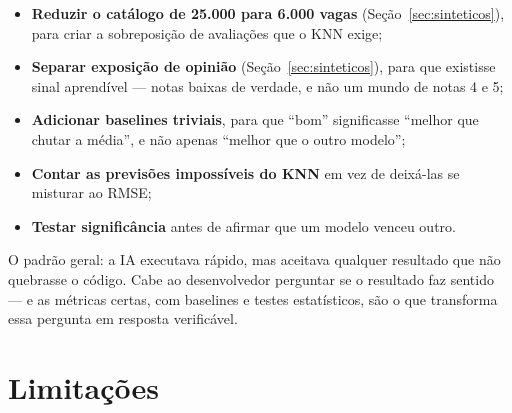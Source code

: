\documentclass[12pt,a4paper]{article}
\begin{document}
\begin{itemize}
    \item \textbf{Reduzir o catálogo de 25.000 para 6.000 vagas} (Seção~\ref{sec:sinteticos}), para criar a sobreposição de avaliações que o KNN exige;
    \item \textbf{Separar exposição de opinião} (Seção~\ref{sec:sinteticos}), para que existisse sinal aprendível --- notas baixas de verdade, e não um mundo de notas 4 e 5;
    \item \textbf{Adicionar baselines triviais}, para que ``bom'' significasse ``melhor que chutar a média'', e não apenas ``melhor que o outro modelo'';
    \item \textbf{Contar as previsões impossíveis do KNN} em vez de deixá-las se misturar ao RMSE;
    \item \textbf{Testar significância} antes de afirmar que um modelo venceu outro.
\end{itemize}

O padrão geral: a IA executava rápido, mas aceitava qualquer resultado que não quebrasse o código. Cabe ao desenvolvedor perguntar se o resultado faz sentido --- e as métricas certas, com baselines e testes estatísticos, são o que transforma essa pergunta em resposta verificável.

\section{Limitações}\label{sec:limitacoes}
\end{document}
